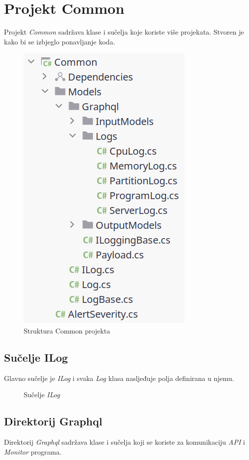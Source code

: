 \documentclass[zavrsnirad]{fer}
\begin{document}
\chapter{Projekt Common}
Projekt \textit{Common} sadržava klase i sučelja koje koriste više projekata. Stvoren je kako bi se izbjeglo ponavljanje koda.
\begin{figure}[htb!]
	\centering
	\includegraphics[width=0.4\linewidth]{images/common_structure.png} 
	\caption{Struktura Common projekta}
	\label{slk:common_structure.png}
\end{figure}
\FloatBarrier

\section{Sučelje ILog}
Glavno sučelje je \textit{ILog} i svaka \textit{Log} klasa nasljeđuje polja definirana u njemu.
\begin{figure}[htb]
	\centering
	
	\caption{Sučelje \textit{ILog}}
\end{figure}
\FloatBarrier

\section{Direktorij Graphql}
Direktorij \textit{Graphql} sadržava klase i sučelja koji se koriste za komunikaciju \textit{API} i \textit{Monitor} programa.
\end{document}
